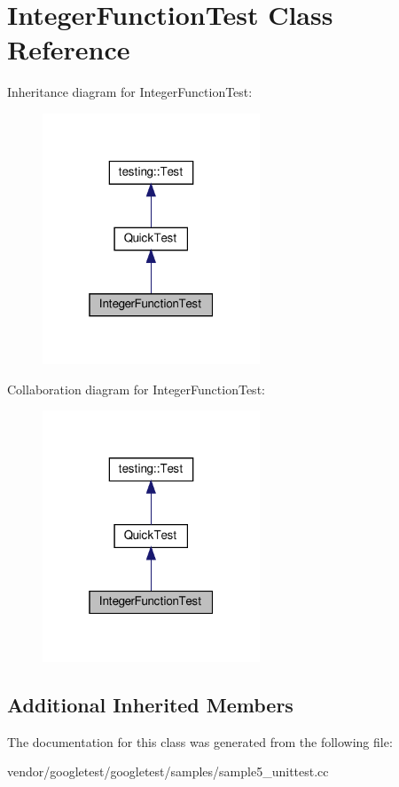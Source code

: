 \hypertarget{class_integer_function_test}{}\section{Integer\+Function\+Test Class Reference}
\label{class_integer_function_test}


Inheritance diagram for Integer\+Function\+Test\+:
\nopagebreak
\begin{figure}[H]
\begin{center}
\leavevmode
\includegraphics[width=184pt]{class_integer_function_test__inherit__graph}
\end{center}
\end{figure}


Collaboration diagram for Integer\+Function\+Test\+:
\nopagebreak
\begin{figure}[H]
\begin{center}
\leavevmode
\includegraphics[width=184pt]{class_integer_function_test__coll__graph}
\end{center}
\end{figure}
\subsection*{Additional Inherited Members}


The documentation for this class was generated from the following file\+:\begin{DoxyCompactItemize}
\item 
vendor/googletest/googletest/samples/sample5\+\_\+unittest.\+cc\end{DoxyCompactItemize}
